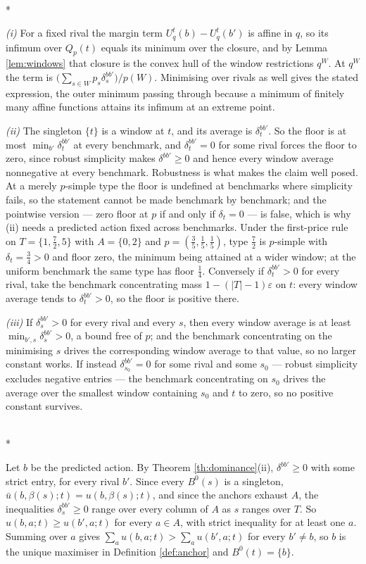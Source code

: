 \documentclass[12pt]{article}
\makeatletter
\theoremstyle{definition}
\renewenvironment{proof}[1][\proofname]{\par
  \pushQED{\qed}%
  \normalfont \topsep6\p@\@plus6\p@\relax
  \trivlist
  \item[\hskip\labelsep\itshape #1\@addpunct{.}]\mbox{}\\*
  \ignorespaces
}{%
  \popQED\endtrivlist\@endpefalse
}
\makeatother
\begin{document}
\begin{proof}[Proof of Proposition \ref{prop:margins}]
\emph{(i)} For a fixed rival the margin term $U^t_q(b) - U^t_q(b')$ is affine in $q$, so its infimum over $Q_p(t)$ equals its minimum over the closure, and by Lemma \ref{lem:windows} that closure is the convex hull of the window restrictions $q^W$. At $q^W$ the term is $\bigl(\sum_{s \in W} p_s \delta^{bb'}_s\bigr)/p(W)$. Minimising over rivals as well gives the stated expression, the outer minimum passing through because a minimum of finitely many affine functions attains its infimum at an extreme point.

\emph{(ii)} The singleton $\{t\}$ is a window at $t$, and its average is $\delta^{bb'}_t$. So the floor is at most $\min_{b'} \delta^{bb'}_t$ at every benchmark, and $\delta^{bb'}_t = 0$ for some rival forces the floor to zero, since robust simplicity makes $\delta^{bb'} \ge 0$ and hence every window average nonnegative at every benchmark. Robustness is what makes the claim well posed. At a merely $p$-simple type the floor is undefined at benchmarks where simplicity fails, so the statement cannot be made benchmark by benchmark; and the pointwise version --- zero floor at $p$ if and only if $\delta_t = 0$ --- is false, which is why (ii) needs a predicted action fixed across benchmarks. Under the first-price rule on $T = \{1, \tfrac72, 5\}$ with $A = \{0,2\}$ and $p = (\tfrac35, \tfrac15, \tfrac15)$, type $\tfrac72$ is $p$-simple with $\delta_t = \tfrac34 > 0$ and floor zero, the minimum being attained at a wider window; at the uniform benchmark the same type has floor $\tfrac14$. Conversely if $\delta^{bb'}_t > 0$ for every rival, take the benchmark concentrating mass $1 - (|T|-1)\varepsilon$ on $t$: every window average tends to $\delta^{bb'}_t > 0$, so the floor is positive there.

\emph{(iii)} If $\delta^{bb'}_s > 0$ for every rival and every $s$, then every window average is at least $\min_{b',s} \delta^{bb'}_s > 0$, a bound free of $p$; and the benchmark concentrating on the minimising $s$ drives the corresponding window average to that value, so no larger constant works. If instead $\delta^{bb'}_{s_0} = 0$ for some rival and some $s_0$ --- robust simplicity excludes negative entries --- the benchmark concentrating on $s_0$ drives the average over the smallest window containing $s_0$ and $t$ to zero, so no positive constant survives.
\end{proof}

\begin{proof}[Proof of Corollary \ref{cor:coverage}]
Let $b$ be the predicted action. By Theorem \ref{th:dominance}(ii), $\delta^{bb'} \ge 0$ with some strict entry, for every rival $b'$. Since every $B^0(s)$ is a singleton, $\bar u(b, \beta(s); t) = u(b, \beta(s); t)$, and since the anchors exhaust $A$, the inequalities $\delta^{bb'}_s \ge 0$ range over every column of $A$ as $s$ ranges over $T$. So $u(b, a; t) \ge u(b', a; t)$ for every $a \in A$, with strict inequality for at least one $a$. Summing over $a$ gives $\sum_a u(b, a; t) > \sum_a u(b', a; t)$ for every $b' \neq b$, so $b$ is the unique maximiser in Definition \ref{def:anchor} and $B^0(t) = \{b\}$.
\end{proof}
\end{document}
